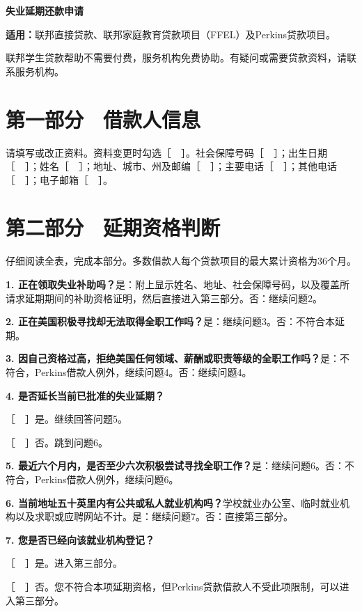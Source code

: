 \documentclass[UTF8,fontset=none,11pt,a4paper]{ctexart}
\begin{document}
{\noindent\fontsize{20}{25}\selectfont\bfseries 失业延期还款申请\par}
\vspace{10pt}
\textbf{适用：}联邦直接贷款、联邦家庭教育贷款项目（FFEL）及Perkins贷\allowbreak\mbox{款项目。}


联邦学生贷款帮助不需要付费，服务机构免费协助。有疑问或需要贷款资料，请联系\allowbreak\mbox{服务机构。}


\section*{第一部分　借款人信息}
请填写或改正资料。资料变更时勾选［　］。社会保障号码［　］；出生日期［　］；姓名［　］；地址、城市、州及邮编［　］；主要电话［　］；其他电话［　］；电子邮箱［　］。


\section*{第二部分　延期资格判断}
仔细阅读全表，完成本部分。多数借款人每个贷款项目的最大累计资格为36个月。


\textbf{1. 正在领取失业补助吗？}是：附上显示姓名、地址、社会保障号码，以及覆盖所请求延期期间的补助资格证明，然后直接进入第三部分。否：继续问题2。


\textbf{2. 正在美国积极寻找却无法取得全职工作吗？}是：继续问题3。否：不符\allowbreak\mbox{合本延期。}


\textbf{3. 因自己资格过高，拒绝美国任何领域、薪酬或职责等级的全职工作吗？}是：不符合，Perkins借款人例外，继续问题4。否：继续问题4。


\textbf{4. 是否延长当前已批准的失业延期？}


［　］是。继续回答问题5。


［　］否。跳到问题6。


\textbf{5. 最近六个月内，是否至少六次积极尝试寻找全职工作？}是：继续问题6。否：不符合，Perkins借款人例外，继续问题6。


\textbf{6. 当前地址五十英里内有公共或私人就业机构吗？}学校就业办公室、临时就业机构以及求职或应聘网站不计。是：继续问题7。否：直接\allowbreak\mbox{第三部分。}


\textbf{7. 您是否已经向该就业机构登记？}


［　］是。进入\allowbreak\mbox{第三部分。}


［　］否。您不符合本项延期资格，但Perkins贷款借款人不受此项限制，可以进入\allowbreak\mbox{第三部分。}
\end{document}
